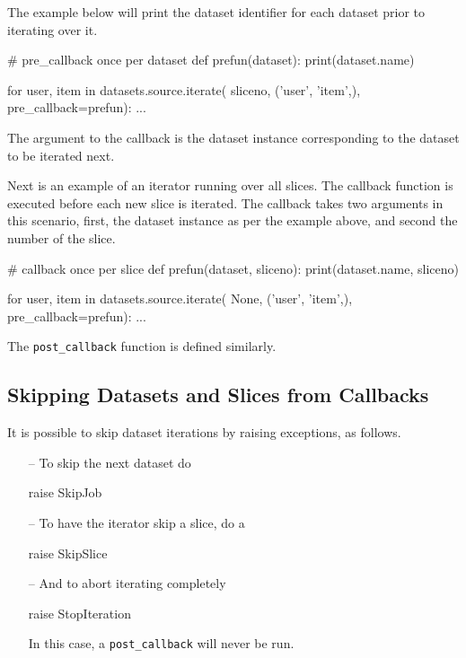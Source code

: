 The example below will print the dataset identifier for each dataset
prior to iterating over it.
\begin{python}
# pre_callback once per dataset
def prefun(dataset):
    print(dataset.name)

for user, item in datasets.source.iterate(
                       sliceno, ('user', 'item',),
                       pre_callback=prefun):
    ...
\end{python}
The argument to the callback is the dataset instance corresponding to
the dataset to be iterated next.

Next is an example of an iterator running over all slices.  The
callback function is executed before each new slice is iterated.  The
callback takes two arguments in this scenario, first, the dataset
instance as per the example above, and second the number of the slice.
\begin{python}
# callback once per slice
def prefun(dataset, sliceno):
    print(dataset.name, sliceno)

for user, item in datasets.source.iterate(
                       None, ('user', 'item',),
                       pre_callback=prefun):
    ...
\end{python}
The \texttt{post\_callback} function is defined similarly.


\subsection{Skipping Datasets and Slices from Callbacks}
It is possible to skip dataset iterations by raising exceptions, as
follows.
\begin{itemize}
\item [--] To skip the next dataset do
\begin{python}
raise SkipJob
\end{python}

\item [--]  To have the iterator skip a slice, do a
\begin{python}
raise SkipSlice
\end{python}

\item [--] And to abort iterating completely
\begin{python}
raise StopIteration
\end{python}
In this case, a \texttt{post\_callback} will never be run.
\end{itemize}



